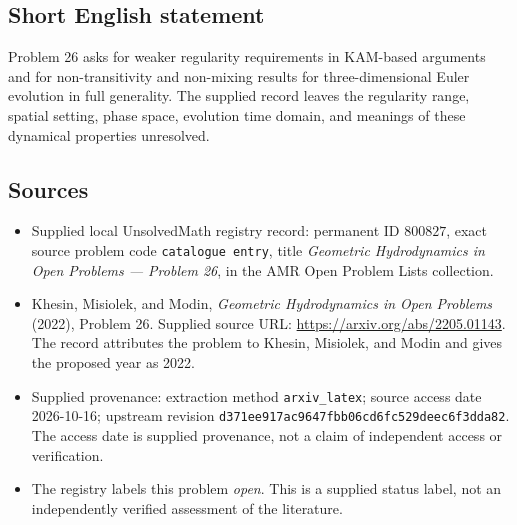 \documentclass[11pt]{article}
\begin{document}
\subsection{Short English statement}
Problem 26 asks for weaker regularity requirements in KAM-based arguments and for non-transitivity and non-mixing results for three-dimensional Euler evolution in full generality. The supplied record leaves the regularity range, spatial setting, phase space, evolution time domain, and meanings of these dynamical properties unresolved.
\subsection{Sources}
\begin{itemize}
\item Supplied local UnsolvedMath registry record: permanent ID $800827$, exact source problem code \texttt{catalogue entry}, title \emph{Geometric Hydrodynamics in Open Problems --- Problem 26}, in the AMR Open Problem Lists collection.
\item Khesin, Misiolek, and Modin, \emph{Geometric Hydrodynamics in Open Problems} (2022), Problem 26. Supplied source URL: \url{https://arxiv.org/abs/2205.01143}. The record attributes the problem to Khesin, Misiolek, and Modin and gives the proposed year as 2022.
\item Supplied provenance: extraction method \texttt{arxiv\_latex}; source access date 2026-10-16; upstream revision \texttt{d371ee917ac9647fbb06cd6fc529deec6f3dda82}. The access date is supplied provenance, not a claim of independent access or verification.
\item The registry labels this problem \emph{open}. This is a supplied status label, not an independently verified assessment of the literature.
\end{itemize}
\end{document}
